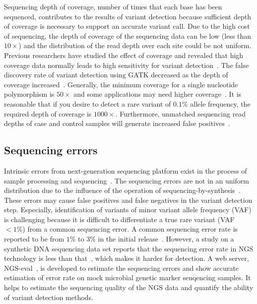\documentclass[a4,center,fleqn]{NAR}
\begin{document}
Sequencing depth of coverage, number of times that each base has been sequenced, contributes to the results of variant detection because sufficient depth of coverage is necessary to support an accurate variant call.
Due to the high cost of sequencing, the depth of coverage of the sequencing data can be low (less than $10\times$) and the distribution of the read depth over each site could be not uniform.
Previous researchers have studied the effect of coverage and revealed that high coverage data normally leads to high sensitivity for variant detection~\citep{neuman2013analysis, krawitz2010microindel, Cheng2014}.
The false discovery rate of variant detection using GATK decreased as the depth of coverage increased~\citep{liu2013variant}.
Generally, the minimum coverage for a single nucleotide polymorphism is $50\times$ and some applications may need higher coverage~\citep{Schlotterer2014}.
It is reasonable that if you desire to detect a rare variant of $0.1\%$ allele frequency, the required depth of coverage is $1000\times$.
Furthermore, unmatched sequencing read depths of case and control samples will generate increased false positives~\citep{garner2011confounded}.

\subsection{Sequencing errors}

Intrinsic errors from next-generation sequencing platform exist in the process of sample processing and sequencing~\citep{Olson2015}.
The sequencing errors are not in an uniform distribution due to the influence of the operation of sequencing-by-synthesis~\citep{nakamura2011sequence, mamanova2010target}.
These errors may cause false positives and false negatives in the variant detection step.
Especially, identification of variants of minor variant allele frequency (VAF) is challenging because it is difficult to differentiate a true rare variant (VAF $<1\%$) from a common sequencing error.
A common sequencing error rate is reported to be from $1\%$ to $3\%$ in the initial release~\citep{shendure2008next}.
However, a study on a synthetic DNA sequencing data set reports that the sequencing error rate in NGS technology is less than that~\citep{Flaherty2012}, which makes it harder for detection.
A web server, NGS-eval~\citep{may2015ngs}, is developed to estimate the sequencing errors and show accurate estimation of error rate on mock microbial genetic marker seuqencing samples.
It helps to estimate the sequencing quality of the NGS data and quantify the ability of variant detection methods.
\end{document}
